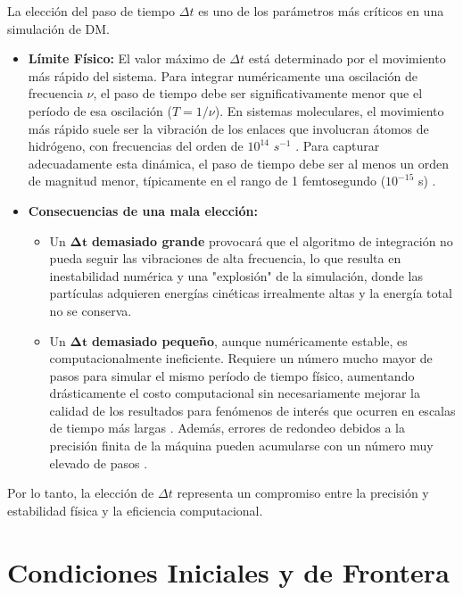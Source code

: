 La elección del paso de tiempo $\Delta t$ es uno de los parámetros más críticos en una simulación de DM.
\begin{itemize}
    \item \textbf{Límite Físico:} El valor máximo de $\Delta t$ está determinado por el movimiento más rápido del sistema. Para integrar numéricamente una oscilación de frecuencia $\nu$, el paso de tiempo debe ser significativamente menor que el período de esa oscilación ($T = 1/\nu$). En sistemas moleculares, el movimiento más rápido suele ser la vibración de los enlaces que involucran átomos de hidrógeno, con frecuencias del orden de $10^{14}$ $s^{-1}$ \cite[8]{jensen2017introduction}. Para capturar adecuadamente esta dinámica, el paso de tiempo debe ser al menos un orden de magnitud menor, típicamente en el rango de 1 femtosegundo ($10^{-15}$ s) \cite[8]{jensen2017introduction}.

    \item \textbf{Consecuencias de una mala elección:}
    \begin{itemize}
        \item Un $\mathbf{\Delta t}$ \textbf{demasiado grande} provocará que el algoritmo de integración no pueda seguir las vibraciones de alta frecuencia, lo que resulta en inestabilidad numérica y una "explosión" de la simulación, donde las partículas adquieren energías cinéticas irrealmente altas y la energía total no se conserva.
        \item Un $\mathbf{\Delta t}$ \textbf{demasiado pequeño}, aunque numéricamente estable, es computacionalmente ineficiente. Requiere un número mucho mayor de pasos para simular el mismo período de tiempo físico, aumentando drásticamente el costo computacional sin necesariamente mejorar la calidad de los resultados para fenómenos de interés que ocurren en escalas de tiempo más largas \cite[452]{jensen2017introduction}. Además, errores de redondeo debidos a la precisión finita de la máquina pueden acumularse con un número muy elevado de pasos \cite[192]{haile1992molecular}.
    \end{itemize}
\end{itemize}
Por lo tanto, la elección de $\Delta t$ representa un compromiso entre la precisión y estabilidad física y la eficiencia computacional.


\section{Condiciones Iniciales y de Frontera}

